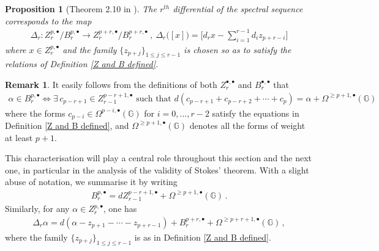 \documentclass[dvipsnames]{amsart}
\newtheorem{proposition}[theorem]{Proposition}
\theoremstyle{definition}
\newtheorem{remark}[theorem]{Remark}
\theoremstyle{definition}
\numberwithin{equation}{section}
\newcommand{\G}{\mathbb{G}}
\begin{document}
\begin{proposition}[Theorem 2.10 in \cite{livernet2020spectral}]\label{prop: expression Delta spectral} The $r^{th}$ differential of the spectral sequence corresponds to the map
\begin{align*}
    \Delta_r\colon Z_r^{p,\bullet}/B_r^{p,\bullet}\longrightarrow Z_r^{p+r,\bullet}/B_r^{p+r,\bullet}\ ,\ \Delta_r\big([x]\big)=\bigg[d_rx-\sum_{i=1}^{r-1}d_iz_{p+r-i}\bigg]
\end{align*}
where $x\in Z_r^{p,\bullet}$ and the family $\{z_{p+j}\}_{1\le j\le r-1}$ is chosen so as to satisfy the relations of Definition \ref{Z and B defined}.    
\end{proposition}
\begin{remark}
    It easily follows from the definitions of both $Z_r^{\bullet,\bullet}$ and $B_r^{\bullet,\bullet}$ that 
    \begin{align*}
        \alpha\in B_r^{p,\bullet}\Longleftrightarrow \exists\, c_{p-r+1}\in Z_{r-1}^{p-r+1,\bullet} \text{ such that }d(c_{p-r+1}+c_{p-r+2}+\cdots+c_p)=\alpha+\Omega^{\ge p+1,\bullet}(\G)
    \end{align*}
    where the forms $c_{p-i}\in\Omega^{p-i,\bullet}(\G)$ for $i=0,\ldots,r-2$ satisfy the equations in Definition \ref{Z and B defined}, and $\Omega^{\ge p+1,\bullet}(\G)$ denotes all the forms of weight at least $p+1$.

    This characterisation will play a central role throughout this section and the next one, in particular in the analysis of the validity of Stokes' theorem. With a slight abuse of notation, we summarise it by writing
    \begin{align*}
        B_r^{p,\bullet}=dZ_{r-1}^{p-r+1,\bullet}+\Omega^{\ge p+1,\bullet}(\G)\,.
    \end{align*}
    Similarly, for any $\alpha\in Z_r^{p,\bullet}$, one has
    \begin{align*}
        \Delta_r\alpha=d(\alpha-z_{p+1}-\cdots-z_{p+r-1})+B_r^{p+r,\bullet}+\Omega^{\ge p+r+1,\bullet}(\G)\,,
    \end{align*}
    where the family $\{z_{p+j}\}_{1\le j\le r-1}$ is as in Definition \ref{Z and B defined}.
\end{remark}
\end{document}

